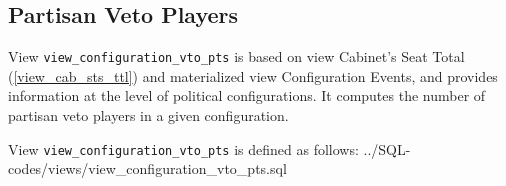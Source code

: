 \subsection{Partisan Veto Players}\label{view_configuration_vto_pts}
View \texttt{view\_configuration\_vto\_pts} is based on view Cabinet's Seat Total (\ref{view_cab_sts_ttl}) and materialized view Configuration Events, and provides information at the level of political configurations.
It computes the number of partisan veto players in a given configuration.

View \texttt{view\_configuration\_vto\_pts} is defined as follows:
%
{../SQL-codes/views/view_configuration_vto_pts.sql}

